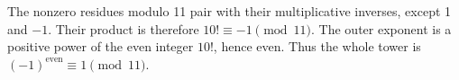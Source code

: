 The nonzero residues modulo 11 pair with their multiplicative inverses, except 1 and $-1$. Their product is therefore $10!\equiv-1\pmod{11}$. The outer exponent is a positive power of the even integer $10!$, hence even. Thus the whole tower is $(-1)^{\text{even}}\equiv\boxed1\pmod{11}$.
